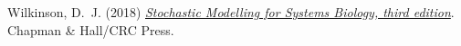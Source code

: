 \documentclass[mathserif,handout]{beamer}
\begin{document}
{\begin{thebibliography}{}
Wilkinson, D.~J. (2018)
 {\em \alert{\href{http://github.com/darrenjw/smfsb}{Stochastic Modelling for Systems Biology, third edition}}}.
 Chapman \& Hall/CRC Press.

\end{thebibliography}

\medskip






}
\end{document}
